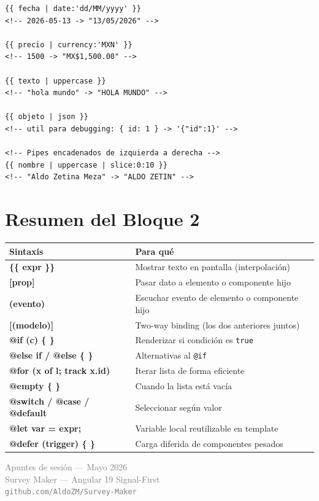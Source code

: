 \documentclass[12pt, a4paper]{article}
\begin{document}
\begin{lstlisting}
{{ fecha | date:'dd/MM/yyyy' }}
<!-- 2026-05-13 -> "13/05/2026" -->

{{ precio | currency:'MXN' }}
<!-- 1500 -> "MX$1,500.00" -->

{{ texto | uppercase }}
<!-- "hola mundo" -> "HOLA MUNDO" -->

{{ objeto | json }}
<!-- util para debugging: { id: 1 } -> '{"id":1}' -->

<!-- Pipes encadenados de izquierda a derecha -->
{{ nombre | uppercase | slice:0:10 }}
<!-- "Aldo Zetina Meza" -> "ALDO ZETIN" -->
\end{lstlisting}

\section{ Resumen del Bloque 2}

\begin{center}
\renewcommand{\arraystretch}{1.6}
\begin{tabular}{>{\ttfamily\bfseries}p{4.5cm} p{8cm}}
\toprule
\textbf{Sintaxis} & \textbf{Para qué} \\
\midrule
\{\{ expr \}\} & Mostrar texto en pantalla (interpolación) \\
{[}prop{]} & Pasar dato a elemento o componente hijo \\
(evento) & Escuchar evento de elemento o componente hijo \\
{[}(modelo){]} & Two-way binding (los dos anteriores juntos) \\
\midrule
@if (c) \{ \} & Renderizar si condición es \texttt{true} \\
@else if / @else \{ \} & Alternativas al \texttt{@if} \\
@for (x of l; track x.id) & Iterar lista de forma eficiente \\
@empty \{ \} & Cuando la lista está vacía \\
@switch / @case / @default & Seleccionar según valor \\
@let var = expr; & Variable local reutilizable en template \\
@defer (trigger) \{ \} & Carga diferida de componentes pesados \\
\bottomrule
\end{tabular}
\end{center}

\vfill
\begin{center}
  \textcolor{gray}{\small {} Apuntes de sesión --- Mayo 2026}\\[0.2cm]
  \textcolor{gray}{\small Survey Maker --- Angular 19 Signal-First}\\[0.2cm]
  \textcolor{gray}{\small \texttt{github.com/AldoZM/Survey-Maker}}
\end{center}
\end{document}
